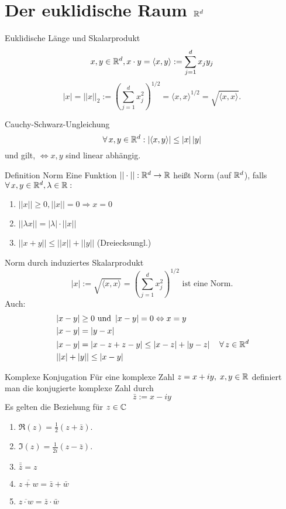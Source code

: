 \documentclass[main.tex]{subfiles}
\begin{document}
\section*{Der euklidische Raum \(\mathbb{R}^d\)}
\begin{karte}{Euklidische Länge und Skalarprodukt}
    \[ x,y \in\mathbb{R}^d, x\cdot y 
    = \langle x,y\rangle 
    := \sum_{j=1}^{d}x_j y_j \]
    \[ |x| = ||x||_2 
    := {\left(\sum_{j=1}^{d} x_j^2 \right)}^{1/2} 
    = \langle x,x\rangle^{1/2} 
    = \sqrt{\langle x,x\rangle}. \]
\end{karte}
\begin{karte}{Cauchy-Schwarz-Ungleichung}
    \[ \forall x,y\in\R^d: 
    \abs{\langle x,y\rangle}
    \leq \abs{x}\abs{y}\]
    und \gqq{\(=\)} gilt, 
    \( \Leftrightarrow x,y \) 
    sind linear abhängig.
\end{karte}
\begin{karte}{Definition Norm}
    Eine Funktion \( ||\cdot || : 
    \mathbb{R}^d \rightarrow \mathbb{R} \) heißt Norm 
    (auf \( \mathbb{R}^d \)), falls 
    \( \forall x,y\in\R^d, \lambda\in\R: \)
	\begin{enumerate}
        \item \( ||x||\geq 0, 
        ||x|| = 0 \Rightarrow x = 0 \)
        \item \( ||\lambda x|| 
        = |\lambda|\cdot||x|| \)
        \item \( ||x+y|| 
        \leq ||x|| + ||y|| \) (Dreiecksungl.)
	\end{enumerate}
\end{karte}
\begin{karte}{Norm durch induziertes Skalarprodukt}
    \[ |x| := \sqrt{\langle x,x\rangle} 
    = {\left(\sum_{j=1}^{d} x_j^2\right)}^{1/2} 
    \text{ ist eine Norm}. \]
    Auch:
	\begin{align*}
        &\abs{x - y} \geq 0 \text{ und } 
        \abs{x - y} = 0 \Leftrightarrow x = y\\
		&\abs{x - y} = \abs{y - x}\\
        &\abs{x - y} = \abs{x-z + z-y} 
        \leq \abs{x - z} + \abs{y - z} 
        \quad \forall z \in \R^d\\
		&\abs{\abs{x} + \abs{y}} \leq \abs{x - y}
	\end{align*}
\end{karte}
\begin{karte}{Komplexe Konjugation}
    Für eine komplexe Zahl 
    \( z=x+iy, \; x,y\in\mathbb{R} \) definiert 
    man die konjugierte komplexe Zahl durch
    \[ \bar{z} := x - iy \]
    Es gelten die Beziehung für \( z\in\mathbb{C} \)
	\begin{enumerate}
		\item \(\Re(z) = \frac{1}{2} (z+\bar{z}). \)
		\item \(\Im(z) = \frac{1}{2i} (z-\bar{z}). \)
		\item \( \bar{\bar{z}} = z \)
		\item \( \overline{z+w} = \bar{z} + \bar{w} \)
		\item \( \overline{z\cdot w} = \bar{z} \cdot \bar{w} \)
    \end{enumerate}
\end{karte}
\end{document}
